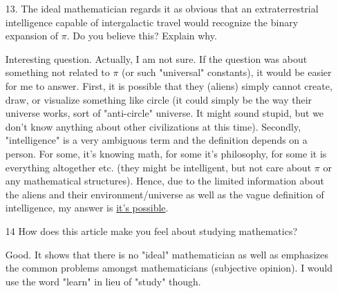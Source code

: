 \documentclass[12pt, a4paper]{article}                  %
\begin{document}
\begin{enumerate}
\item[13.]
The ideal mathematician regards it as obvious that an extraterrestrial intelligence
capable of intergalactic travel would recognize the binary expansion of $\pi$.
Do you believe this? Explain why.

Interesting question. Actually, I am not sure. If the question was about something not
related to $\pi$ (or such "universal" constants), it would be easier for me to answer.
First, it is possible that they (aliens) simply cannot create, draw, or visualize something like circle 
(it could simply be the way their universe works, sort of "anti-circle" universe. It might sound stupid, but we don't know anything about
other civilizations at this time). Secondly, "intelligence" is a very ambiguous term and the definition depends on a person. For some, it's knowing math,
for some it's philosophy, for some it is everything altogether etc. (they might be intelligent, but not care about $\pi$ or any mathematical structures).
Hence, due to the limited information about the aliens and their environment/universe as well as the vague definition of intelligence, my answer is
\underline{it's possible}.

\item[14]
How does this article make you feel about studying mathematics?

Good. It shows that there is no "ideal" mathematician as well as
emphasizes the common problems amongst mathematicians (subjective opinion).
I would use the word "learn" in lieu of "study" though.
\end{enumerate}
\end{document}
